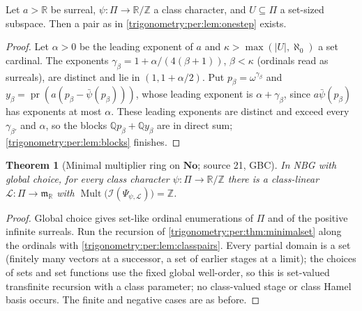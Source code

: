 \documentclass[11pt,letterpaper]{article}
\numberwithin{equation}{section}
\newtheorem{theorem}{Theorem}[section]
\theoremstyle{definition}
\theoremstyle{remark}
\newcommand{\No}{\mathbf{No}}
\newcommand{\R}{\mathbb R}
\newcommand{\Q}{\mathbb Q}
\newcommand{\Z}{\mathbb Z}
\newcommand{\mm}{\mathfrak m}
\newcommand{\Mult}{\operatorname{Mult}}
\newcommand{\pr}{\operatorname{pr}}
\newcommand{\cI}{\mathcal I}
\newcommand{\cL}{\mathcal L}
\begin{document}
\begin{lemma}\label{trigonometry:per:lem:classpairs}
Let $a>\R$ be surreal, $\psi:\Pi\to\R/\Z$ a class character, and $U\subseteq\Pi$ a set-sized
subspace. Then a pair as in \cref{trigonometry:per:lem:onestep} exists.
\end{lemma}
\begin{proof}
Let $\alpha>0$ be the leading exponent of $a$ and $\kappa>\max(|U|,\aleph_0)$ a set cardinal. The
exponents $\gamma_\beta=1+\alpha/(4(\beta+1))$, $\beta<\kappa$ (ordinals read as surreals), are
distinct and lie in $(1,1+\alpha/2)$. Put $p_\beta=\omega^{\gamma_\beta}$ and
$y_\beta=\pr(a(p_\beta-\bar\psi(p_\beta)))$, whose leading exponent is $\alpha+\gamma_\beta$, since
$a\bar\psi(p_\beta)$ has exponents at most $\alpha$. These leading exponents are distinct and exceed
every $\gamma_{\beta'}$ and $\alpha$, so the blocks $\Q p_\beta+\Q y_\beta$ are in direct sum;
\cref{trigonometry:per:lem:blocks} finishes.
\end{proof}

\begin{theorem}[Minimal multiplier ring on $\No$; source 21, GBC]\label{trigonometry:per:thm:minimalclass}
In NBG with global choice, for every class character $\psi:\Pi\to\R/\Z$ there is a class-linear
$\cL:\Pi\to\mm_{\R}$ with $\Mult\bigl(\cI(\Psi_{\psi,\cL})\bigr)=\Z$.
\end{theorem}
\begin{proof}
Global choice gives set-like ordinal enumerations of $\Pi$ and of the positive infinite surreals. Run
the recursion of \cref{trigonometry:per:thm:minimalset} along the ordinals with
\cref{trigonometry:per:lem:classpairs}. Every partial domain is a set (finitely many vectors at a
successor, a set of earlier stages at a limit); the choices of sets and set functions use the fixed
global well-order, so this is set-valued transfinite recursion with a class parameter; no class-valued
stage or class Hamel basis occurs. The finite and negative cases are as before.
\end{proof}
\end{document}

